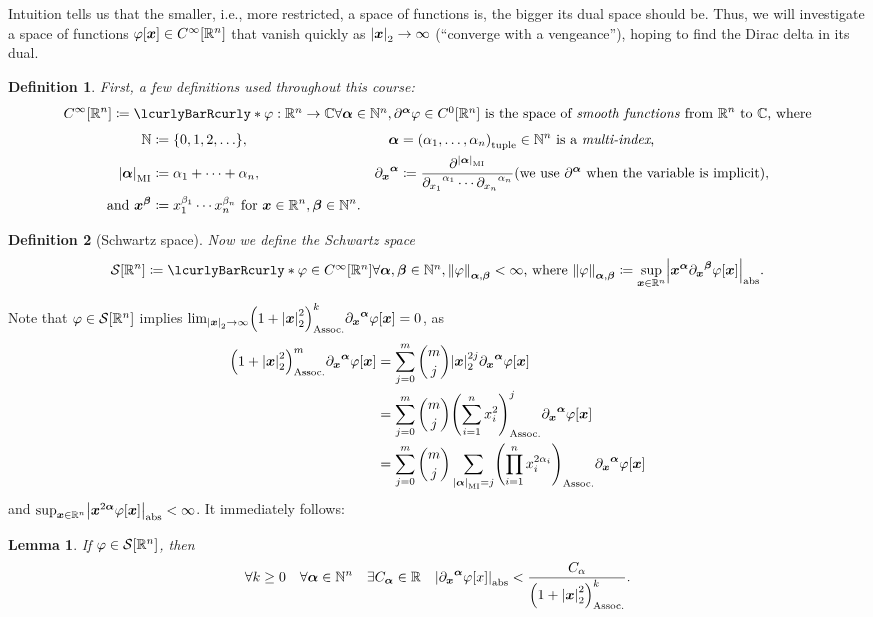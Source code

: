 \documentclass[10pt]{article}
\newtheorem*{definition}{Definition}
\newtheorem*{lemma}{Lemma}
\DeclarePairedDelimiter\doubleBars{\Vert}{\Vert}
\DeclarePairedDelimiter\singleBars{\lvert}{\rvert}
\DeclarePairedDelimiter\parentheses{\lparen}{\rparen}
\DeclarePairedDelimiter\squareBrackets{[}{]}
\DeclarePairedDelimiter\curlyBrackets{\lbrace}{\rbrace}
\newcommand{\pd}[2]{{\partial_{#1}}^{#2}}
\newcommand{\pdop}[1]{\partial^{#1}}
\newcommand{\N}{\mathbb{N}}
\newcommand{\R}{\mathbb{R}}
\newcommand{\C}{\mathbb{C}}
\newcommand{\Cont}[1][0]{C^{#1}}
\newcommand{\Continf}{\Cont[\infty]}
\newcommand{\SchwartzSpace}{\mathcal{S}}
\newcommand\of[1]{\parentheses*{#1}}
\newcommand\pa[1]{\parentheses*{#1}}
\newcommand\tuple[1]{\parentheses*{#1}}
\newcommand\set[1]{\curlyBrackets*{#1}}
\newcommand\abs[1]{\singleBars*{#1}}
\newcommand\norm[1]{\singleBars*{#1}}
\newcommand{\SchwartzNorm}[3]{\doubleBars*{#3}_{#1,#2}}
\newcommand\total[1]{\singleBars*{#1}}
\newcommand{\setst}[2]{\lcurlyBarRcurly*{{\textstyle #1}}{{\textstyle #2}}}
\newcommand\ga\alpha
\newcommand\gb\beta
\newcommand\gj\varphi
\newcommand{\vx}{{\vectorsym x}}
\newcommand{\miga}{{\vectorsym \alpha}}
\newcommand{\migb}{{\vectorsym \beta}}
\newcommand{\funcspec}[3]{{#1}:{#2}\rightarrow{#3}}
\newcommand{\conv}[3][]{%
\ifstrempty{#1}%
{#2 \rightarrow #3}%
{#2\xrightarrow{#1}#3}%
}
\renewcommand\pa[1]{\parentheses*{#1}_\mathrm{Assoc.}}
\renewcommand\of[1]{\squareBrackets*{#1}}
\renewcommand\total[1]{\singleBars*{#1}_{\mathrm{MI}}}
\renewcommand\norm[1]{\singleBars*{#1}_{2}}
\renewcommand\abs[1]{\singleBars*{#1}_{\mathrm{abs}}}
\renewcommand\tuple[1]{\parentheses*{#1}_{\mathrm{tuple}}}
\newcommand{\Rn}{{\R^n}}
\newcommand{\Schwartz}{{\SchwartzSpace\of{\Rn}}}
\begin{document}
  Intuition tells us that the smaller, i.e., more restricted, a space of functions is, the bigger its dual space should be. Thus, we will investigate a space of functions $\gj\of\vx \in \Continf\of\Rn$ that vanish quickly as $\conv {\norm\vx} \infty$ (``converge with a vengeance''), hoping to find the Dirac delta in its dual.
  \begin{definition} First, a few definitions used throughout this course:
  \begin{equation*}
    \Continf\of\Rn \coloneqq \setst{\funcspec\gj\Rn\C}
    {\forall \miga \in \N^n, \pdop\miga\gj \in \Cont\of\Rn}
    \text{ is the space of \emph{smooth functions} from }\Rn \text{ to } \C \text{, where}
  \end{equation*}
  \begin{align*}
    \N &\coloneqq \set{0, 1, 2, \dotsc},
    &\miga &= \tuple{\ga_1, \dotsc, \ga_n} \in \N^n \text{ is a \emph{multi-index},} \\
    \total{\miga} &\coloneqq \ga_1 + \dotsb + \ga_n,\quad
    &\pd\vx\miga &\coloneqq \frac{\partial^{\total{\miga}}}{\pd{x_1}{\ga_1} \dotsm \pd{x_n}{\ga_n}}
    \text{(we use }\pdop\miga\text{ when the variable is implicit),} \\
    \text{and }\vx^\migb &\coloneqq x_1^{\gb_1} \dotsm x_n^{\gb_n}
    \text{ for }\vx \in \Rn, \migb \in \N^n.
  \end{align*}
  \end{definition}

  \begin{definition}[Schwartz space]  Now we define the \emph{Schwartz space}
  \begin{equation*}
    \Schwartz \coloneqq \setst{\gj \in \Continf\of\Rn}{\forall \miga, \migb \in \N^n, \SchwartzNorm{\miga}{\migb}{\gj} < \infty}
    \text{, where }\SchwartzNorm{\miga}{\migb}{\gj} \coloneqq \sup_{\vx\in\R^n}\abs{\vx^\miga\pd\vx\migb \gj\of\vx}.
  \end{equation*}
  \end{definition}
  
  Note that $\gj \in \Schwartz$ implies $\lim_{\conv {\norm\vx} \infty}\pa{1+\norm{\vx}^2}^k \pd\vx\miga \gj\of\vx = 0$, as
  \begin{align*}
    \pa{1+\norm{\vx}^2}^m \pd\vx\miga \gj\of\vx 
    &= \sum{j = 0}[m] \binom{m}{j} \norm{\vx}^{2j} \pd\vx\miga \gj\of\vx \\
    &= \sum{j = 0}[m] \binom{m}{j} \pa{\sum{i=1}[n]x_i^2}^j \pd\vx\miga \gj\of\vx \\
    &= \sum{j = 0}[m] \binom{m}{j} \sum{\total{\miga} = j}\pa{\prod{i = 1}[n] x_i^{2\ga_i}} \pd\vx\miga \gj\of\vx
  \end{align*}
  and $\sup_{\vx \in \Rn}\abs{\vx^{2 \miga} \gj\of\vx}<\infty$. It immediately follows:
  \begin{lemma}
    If $\gj \in \Schwartz$, then
    \begin{equation*}
      \forall k \geq 0\quad \forall \miga \in \N^n\quad \exists C_\miga \in \R \quad \abs{\pd\vx\miga\gj\of{x}} < \frac{C_\alpha}{\pa{1 + \norm{\vx}^2}^k}.
    \end{equation*}
  \end{lemma}
\end{document}
